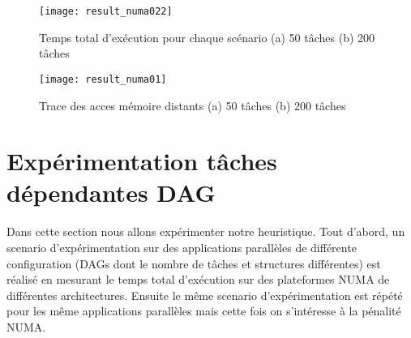 %
\begin{figure}[h]
\texttt{[image: result\_numa022]}
\centering
\caption{Temps total d'exécution pour chaque scénario (a) 50 tâches (b) 200 tâches}
\label{fig:TotalExeTimeSCAB}
\end{figure}
%
\begin{figure}[h]
\texttt{[image: result\_numa01]}
\centering
\caption{Trace des acces mémoire distants (a) 50 tâches (b) 200 tâches}
\label{fig:RemoteAccessMemTraceAB}
\end{figure}
%

%
\newpage
\section{Expérimentation tâches dépendantes DAG} \label{etdar} 
%
Dans cette section nous allons expérimenter notre heuristique. Tout d'abord, un scenario d'expérimentation sur des applications parallèles de différente configuration (DAGs dont le nombre de tâches et structures différentes) est réalisé en mesurant le temps total d'exécution sur des plateformes NUMA de différentes architectures. Ensuite le même scenario d'expérimentation est répété pour les même applications parallèles mais cette fois on s'intéresse à la pénalité NUMA.
%
